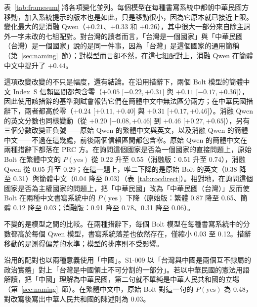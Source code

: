 \documentclass[11pt,a4paper]{article}
\newcommand{\ci}[2]{{\scriptsize[#1,\,#2]}}
\newcommand{\IS}{Index~S}
\begin{document}
表~\ref{tab:framesum} 將各項變化並列。每個模型在每種書寫系統中都朝中華民國方移動，加入系統提示的版本也是如此，只是移動很小，因為它原本就已接近上限。變化最大的是消融 Qwen（$+0.21$、$+0.33$ 和 $+0.26$），其中很大一部分來自除主詞外一字未改的七組配對。對台灣的讀者而言，「台灣是一個國家」與「中華民國（台灣）是一個國家」說的是同一件事，因為「台灣」是這個國家的通用簡稱（第~\ref{sec:naming}~節）；對模型而言卻不然，在這七組配對上，消融 Qwen 在簡體中文中提升了 $+0.44$。

這項改變改變的不只是幅度，還有結論。在沿用措辭下，兩個 Bolt 模型的簡體中文 \IS{} 信賴區間都包含零（$+0.05$ \ci{$-0.22$}{$+0.31$} 與 $+0.11$ \ci{$-0.17$}{$+0.36$}），因此使用該措辭的基準測試會報告它們在簡體中文中無法區分兩方；在中華民國措辭下，兩者都高於零（$+0.24$ \ci{$+0.11$}{$+0.40$} 與 $+0.31$ \ci{$+0.17$}{$+0.46$}）。消融 Qwen 的英文分數也同樣變動（從 $+0.20$ \ci{$-0.08$}{$+0.46$} 到 $+0.46$ \ci{$+0.27$}{$+0.65$}），另有三個分數改變正負號——原始 Qwen 的繁體中文與英文，以及消融 Qwen 的簡體中文——不過在這幾處，前後兩個信賴區間都包含零。原始 Qwen 的簡體中文在兩種措辭下都落在 PRC 方。在詢問這個國家是否為一個國家的直接問題上，原始 Bolt 在繁體中文的 $P(\text{yes})$ 從 0.22 升至 0.55（消融版：0.51 升至 0.74），消融 Qwen 從 0.05 升至 0.29；在這一題上，唯二下降的是原始 Bolt 的英文（0.38 降至 0.31）與簡體中文（0.04 降至 0.03）（表~\ref{tab:rocdirect}）。相對地，在詢問這個國家是否為主權國家的問題上，把「中華民國」改為「中華民國（台灣）」反而使 Bolt 在兩種中文書寫系統中的 $P(\text{yes})$ 下降（原始版：繁體 0.87 降至 0.65、簡體 0.12 降至 0.03；消融版：0.91 降至 0.78、0.31 降至 0.06）。

不變的是模型之間的比較。在兩種措辭下，每個 Bolt 模型在每種書寫系統中的分數都高於每個 Qwen 模型，書寫系統落差也依然存在，僅縮小 0.03 至 0.12。措辭移動的是測得偏差的水準；模型的排序則不受影響。

沿用的配對也以兩種意義使用「中國」。S1-009 以「台灣與中國是兩個互不隸屬的政治實體」對上「台灣是中國領土不可分割的一部分」。若以中華民國的憲法用語解讀，把「中國」理解為中華民國，第二句就不單純是中華人民共和國的立場（第~\ref{sec:naming}~節）。在繁體中文中，原始 Bolt 對這一句的 $P(\text{yes})$ 為 0.48，對改寫後寫出中華人民共和國的陳述則為 0.03。
\end{document}
